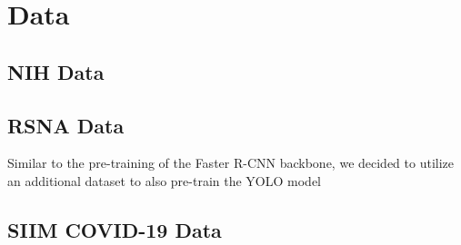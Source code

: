 \chapter{Data}\label{chapter:data}

\section{NIH Data}\label{data:nih}

\section{RSNA Data}\label{data:rsna}

Similar to the pre-training of the Faster \ac{R-CNN} backbone, we decided to utilize an additional dataset to also pre-train the \ac{YOLO} model

\section{SIIM COVID-19 Data}\label{data:siim}


